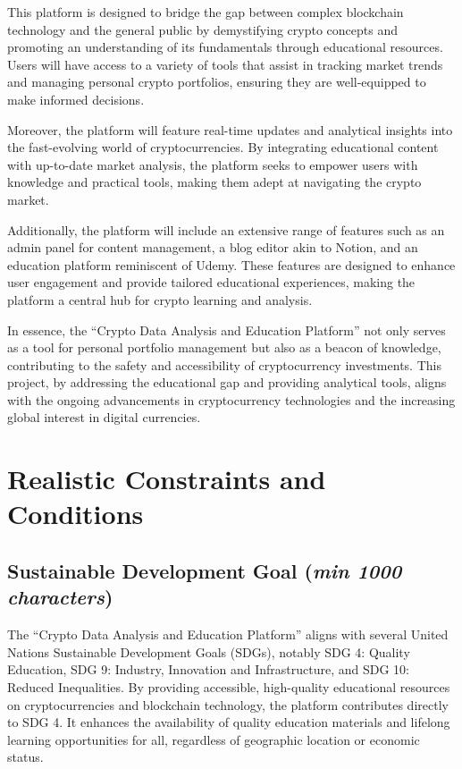 \documentclass[12pt]{report}
\newcommand{\characters}[1]{(\textit{min #1 characters})}
\begin{document}
This platform is designed to bridge the gap between complex blockchain technology and the general public by demystifying crypto concepts and promoting an understanding of its fundamentals through educational resources. Users will have access to a variety of tools that assist in tracking market trends and managing personal crypto portfolios, ensuring they are well-equipped to make informed decisions.

Moreover, the platform will feature real-time updates and analytical insights into the fast-evolving world of cryptocurrencies. By integrating educational content with up-to-date market analysis, the platform seeks to empower users with knowledge and practical tools, making them adept at navigating the crypto market.

Additionally, the platform will include an extensive range of features such as an admin panel for content management, a blog editor akin to Notion, and an education platform reminiscent of Udemy. These features are designed to enhance user engagement and provide tailored educational experiences, making the platform a central hub for crypto learning and analysis.

In essence, the ``Crypto Data Analysis and Education Platform'' not only serves as a tool for personal portfolio management but also as a beacon of knowledge, contributing to the safety and accessibility of cryptocurrency investments. This project, by addressing the educational gap and providing analytical tools, aligns with the ongoing advancements in cryptocurrency technologies and the increasing global interest in digital currencies.


\section{Realistic Constraints and Conditions}

\subsection{Sustainable Development Goal \characters{1000}}
The ``Crypto Data Analysis and Education Platform'' aligns with several United Nations Sustainable Development Goals (SDGs), notably SDG 4: Quality Education, SDG 9: Industry, Innovation and Infrastructure, and SDG 10: Reduced Inequalities. By providing accessible, high-quality educational resources on cryptocurrencies and blockchain technology, the platform contributes directly to SDG 4. It enhances the availability of quality education materials and lifelong learning opportunities for all, regardless of geographic location or economic status.
\end{document}
